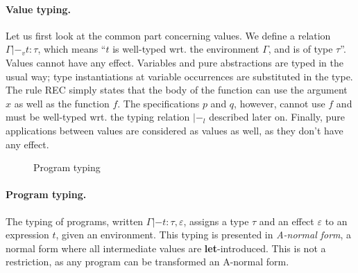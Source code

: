 \documentclass[a4paper]{llncs}
\newcommand{\letml}{{\bf let}}
\newcommand{\inml}{{\bf in}}
\newcommand{\ifml}{{\bf if}}
\newcommand{\thenml}{{\bf then}}
\newcommand{\elseml}{{\bf else}}
\newcommand{\boolml}{{\bf bool}}
\newcommand{\alist}[1]{\overline{#1} }
\begin{document}
\paragraph{Value typing.}
Let us first look at the common part concerning values. We define a relation
$Γ|-_v t : τ$, which means ``$t$ is well-typed wrt. the environment $Γ$, and
is of type $τ$''. Values cannot have any effect.  Variables and pure
abstractions are typed in the usual way; type instantiations at variable
occurrences are substituted in the type. The rule {\sc REC} simply states that
the body of the function can use the argument $x$ as well as the function $f$.
The specifications $p$ and $q$, however, cannot use $f$ and must be well-typed
wrt. the typing relation $|-_l$ described later on. Finally, pure applications
between values are considered as values as well, as they don't have any
effect.

\begin{figure}[tpb]
  \caption{Program typing}
  \label{fig:progtyping}
\end{figure}

\paragraph{Program typing.}
The typing of programs, written $Γ|- t : τ,ε$, assigns a type $τ$ and an
effect $ε$ to an expression $t$, given an environment. This typing is
presented in {\em A-normal form}, a normal form where all intermediate values
are \letml-introduced. This is not a restriction, as any program can be
transformed an A-normal form.
\end{document}
